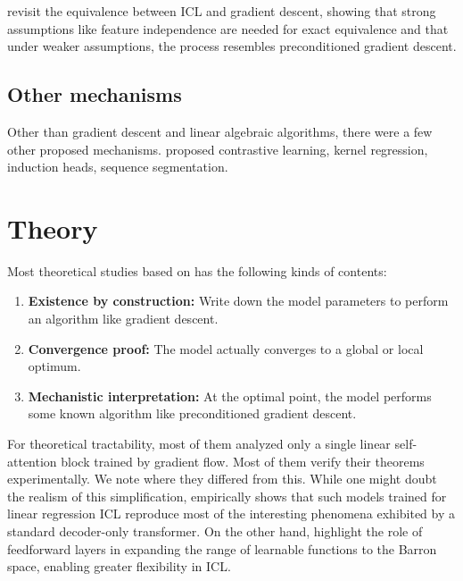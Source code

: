 \documentclass[12pt]{article}
\begin{document}
\cite{mahdaviRevisitingEquivalenceInContext2024} revisit the equivalence between ICL and gradient descent, showing that strong assumptions like feature independence are needed for exact equivalence and that under weaker assumptions, the process resembles preconditioned gradient descent.

\subsection{Other mechanisms}

Other than gradient descent and linear algebraic algorithms, there were a few other proposed mechanisms. \cite{renIncontextLearningTransformer2023} proposed contrastive learning, \cite{hanExplainingEmergentInContext2023} kernel regression, \cite{reddyMechanisticBasisData2023} induction heads, \cite{abernethyMechanismSampleEfficientInContext2023} sequence segmentation.

\section{Theory}

Most theoretical studies based on \cite{gargWhatCanTransformers2022} has the following kinds of contents:

\begin{enumerate}
	\item \textbf{Existence by construction:} Write down the model parameters to perform an algorithm like gradient descent.
	\item \textbf{Convergence proof:} The model actually converges to a global or local optimum.
	\item \textbf{Mechanistic interpretation:} At the optimal point, the model performs some known algorithm like preconditioned gradient descent.
\end{enumerate}

For theoretical tractability, most of them analyzed only a single linear self-attention block trained by gradient flow. Most of them verify their theorems experimentally. We note where they differed from this. While one might doubt the realism of this simplification, \cite{ahnLinearAttentionMaybe2024} empirically shows that such models trained for linear regression ICL reproduce most of the interesting phenomena exhibited by a standard decoder-only transformer. On the other hand,  \cite{kimTransformersLearnNonlinear2024} highlight the role of feedforward layers in expanding the range of learnable functions to the Barron space, enabling greater flexibility in ICL.
\end{document}
